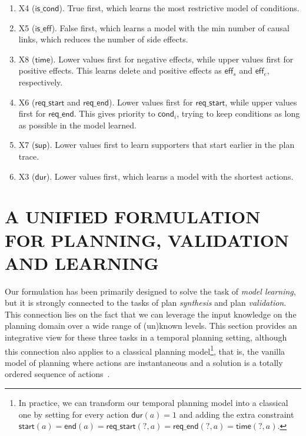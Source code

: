 \documentclass{ecai}
\newcommand{\eff}{\mathsf{eff}}    %
\newcommand{\cond}{\mathsf{cond}}  %
\newcommand{\dur}{\mathsf{dur}}    %
\newcommand{\iscond}{\mathsf{is\_cond}}    %
\newcommand{\iseff}{\mathsf{is\_eff}}    %
\newcommand{\start}{\mathsf{start}}%
\newcommand{\en}{\mathsf{end}}     %
\newcommand{\supp}{\mathsf{sup}}   %
\newcommand{\tim}{\mathsf{time}}   %
\newcommand{\reqs}{\mathsf{req\_{start}}} %
\newcommand{\reqe}{\mathsf{req\_{end}}}   %
\begin{document}
\begin{enumerate}
	\item X4 ($\iscond$). True first, which learns the most restrictive model of conditions.

	\item X5 ($\iseff$). False first, which learns a model with the min number of causal links, which reduces the number of side effects.

	\item X8 ($\tim$). Lower values first for negative effects, while upper values first for positive effects. This learns delete and positive effects as $\eff_s$ and $\eff_e$, respectively.

	\item X6 ($\reqs$ and $\reqe$). Lower values first for $\reqs$, while upper values first for $\reqe$. This gives priority to $\cond_i$, trying to keep conditions as long as possible in the model learned.
	
	\item X7 ($\supp$). Lower values first to learn supporters that start earlier in the plan trace.

	\item X3 ($\dur$). Lower values first, which learns a model with the shortest actions.

\end{enumerate}


\section{A UNIFIED FORMULATION FOR PLANNING, VALIDATION AND LEARNING}
\label{sec:usingCPValidation}

Our formulation has been primarily designed to solve the task of \textit{model learning}, but it is strongly connected to the tasks of plan {\em synthesis} and plan {\em validation}. This connection lies on the fact that we can leverage the input knowledge on the planning domain over a wide range of (un)known levels. This section provides an integrative view for these three tasks in a temporal planning setting, although this connection also applies to a classical planning model\footnote{In practice, we can transform our temporal planning model into a classical one by setting for every action $\dur(a)=1$ and adding the extra constraint $\start(a)=\en(a)=\reqs(?,a)=\reqe(?,a)=\tim(?,a)$.}, that is, the vanilla model of planning where actions are instantaneous
and a solution is a totally ordered sequence of actions~\cite{geffner2013concise}.
\end{document}
